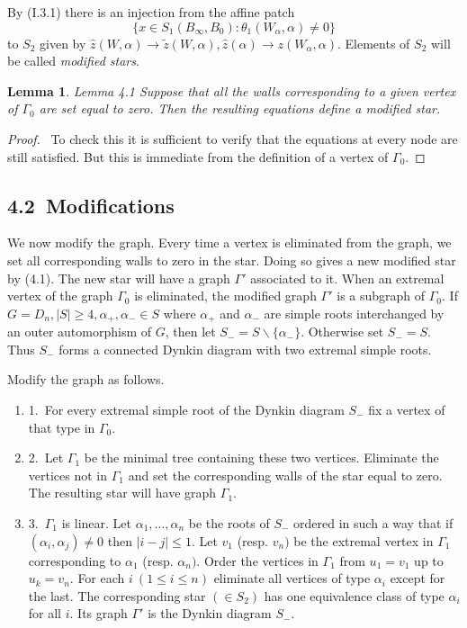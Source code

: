 \documentclass{memo-l}
\newtheorem{lemma}[theorem]{Lemma}
\theoremstyle{definition}
\theoremstyle{remark}
\numberwithin{section}{chapter}
\numberwithin{equation}{chapter}
\begin{document}
\noindent
By (I.3.1) there is an injection from the affine patch 
$$
\{x  \in  S_{1}(B_{{\infty}},B_0):
{\theta}_{1}(W_{{\alpha}},{\alpha})\ne 0\}
$$
to $S_{2}$ given by $\hat z(W,{\alpha}) {\to} \tilde z (W,{\alpha}), \hat
z({\alpha}) {\to} z(W_{{\alpha}},{\alpha})$.  Elements of $S_{2}$ will be
called {\it  modified stars}.

\medskip

\begin{lemma}{Lemma 4.1} Suppose that all the walls corresponding to a
given vertex of ${\Gamma}_{0}$ are set equal to zero.  Then the resulting
equations define a modified star.
\end{lemma}

\medskip

\begin{proof} \ To check this it is sufficient to verify that the
equations at every node are still satisfied.  But this is immediate from
the definition of a vertex of ${\Gamma}_{0}$.
\end{proof} 


\subsection{4.2\   Modifications}

   We now modify the graph.  Every time a vertex is eliminated from the
graph, we set all corresponding walls to zero in the star.  Doing so gives
a new modified star by (4.1).  The new star will have a graph ${\Gamma}'$
associated to it.  When an extremal vertex of the graph ${\Gamma}_{0}$ is
eliminated, the modified graph ${\Gamma}'$ is a subgraph of ${\Gamma}_{0}$.
  If $G = D_{n}, \vert S\vert \ge 4,
{\alpha}_{+},{\alpha}_{-}  \in  S$ where ${\alpha}_{+}$ and ${\alpha}_{-}$
are simple roots interchanged by an outer automorphism of $G$, then let
$S_{-} = S\backslash \{{\alpha}_{-}\}$.  Otherwise set $S_-=S$.
Thus $S_{-}$ forms a connected
Dynkin diagram with two extremal simple roots.

   Modify the graph as follows.
\begin{enumerate}
\item{1.}\  For every extremal simple root of the Dynkin diagram $S_{-}$ fix a
vertex of that type in ${\Gamma}_{0}$.
\item{2.}\  Let ${\Gamma}_{1}$ be the minimal tree containing these two vertices.
Eliminate the vertices not in ${\Gamma}_{1}$ and set the corresponding
walls of the star equal to zero.  The resulting star will have graph
${\Gamma}_{1}$.
\item{3.}\   ${\Gamma}_{1}$ is linear.  Let ${\alpha}_{1},\ldots ,{\alpha}_{n}$ be
the roots of $S_{-}$ ordered in such a way that if
$({\alpha}_{i},{\alpha}_{j})\ne 0$ then $\vert i-j\vert \le 1$.  Let
$v_{1}$ (resp.  $v_{n})$ be the extremal vertex in ${\Gamma}_{1}$
corresponding to ${\alpha}_{1}$ (resp.  ${\alpha}_{n})$.  Order the
vertices in ${\Gamma}_{1}$ from $u_{1} = v_{1}$ up to $u_{k} = v_{n}$.  For
each $i\ (1 \le i \le n)$ eliminate all vertices of type ${\alpha}_{i}$
except for the last.  The corresponding star $( \in  S_{2})$ has one
equivalence class of type ${\alpha}_{i}$ for all $i$.  Its graph
${\Gamma}'$ is the Dynkin diagram $S_{-}$.
\end{enumerate}
\end{document}
